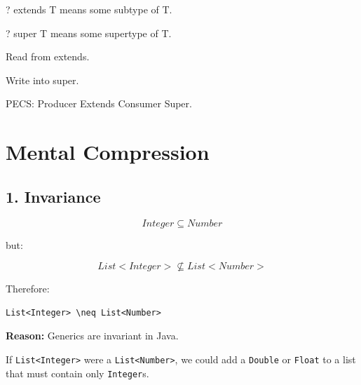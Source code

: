 \documentclass[11pt,a4paper]{book}
\begin{document}
\begin{rosettarule}

? extends T means
some subtype of T.

\end{rosettarule}

\begin{rosettarule}

? super T means
some supertype of T.

\end{rosettarule}

\begin{rosettarule}

Read from extends.

\end{rosettarule}

\begin{rosettarule}

Write into super.

\end{rosettarule}

\begin{rosettarule}

PECS:
Producer Extends
Consumer Super.

\end{rosettarule}

\section{Mental Compression}

\subsection*{1. Invariance}

\[
Integer \subseteq Number
\]

but:

\[
List<Integer> \not\subseteq List<Number>
\]

Therefore:

\begin{verbatim}
List<Integer> \neq List<Number>
\end{verbatim}

\textbf{Reason:} Generics are invariant in Java.

If \texttt{List<Integer>} were a \texttt{List<Number>}, we could add
a \texttt{Double} or \texttt{Float} to a list that must contain only
\texttt{Integer}s.
\end{document}

